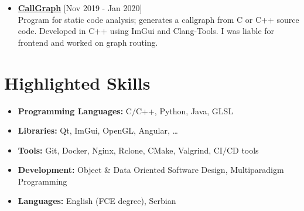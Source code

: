 \documentclass[a4paper]{moderncv}
\begin{document}
\begin{itemize}
			\item \textbf{\href{https://github.com/djordjetane/CallGraph}{CallGraph}} \hfill[Nov 2019 - Jan 2020]\\
			Program for static code analysis; generates a callgraph from C or C++ source code. Developed in C++ using 
			ImGui and Clang-Tools. I was liable for frontend and worked on graph routing.

		\end{itemize}

\section{Highlighted Skills}

	\begin{itemize}
		
		\item \textbf{Programming Languages: } C$\slash$C++, Python, Java, GLSL
		\item \textbf{Libraries: } Qt, ImGui, OpenGL, Angular, \dots
		\item \textbf{Tools: } Git, Docker, Nginx, Rclone, CMake, Valgrind, CI$\slash$CD tools
		\item \textbf{Development: } Object \& Data Oriented Software Design, Multiparadigm Programming
		\item \textbf{Languages: } English (FCE degree), Serbian
		
	\end{itemize}
%
%
\end{document}
